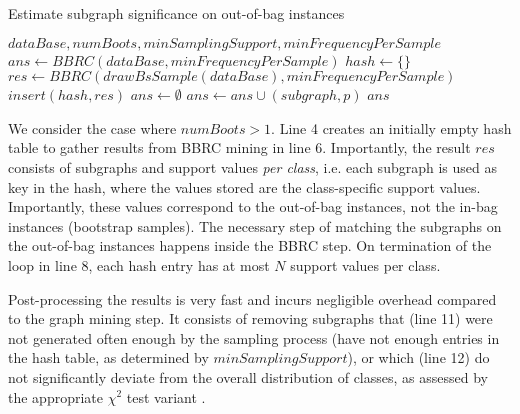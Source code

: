 \documentclass{article}
\begin{document}
\renewcommand{\algorithmicrequire}{\textbf{Input:}}
\renewcommand{\algorithmicensure}{\textbf{Output:}}
\begin{algorithm}
  \caption{Estimate subgraph significance on out-of-bag instances}
  \label{alg:bbrc-sample}
\begin{algorithmic}[1]
  \Require $dataBase, numBoots, minSamplingSupport, minFrequencyPerSample$
    \State $ans \gets BBRC(dataBase, minFrequencyPerSample)$
  \Else
    \State $hash \gets \{\}$
     
        \State $res \gets BBRC(drawBsSample(dataBase), minFrequencyPerSample)$
      \State $insert(hash,res)$
    \EndFor
    \State $ans \gets \emptyset$
          \State $ans\gets ans \cup (subgraph,p)$
        \EndIf
      \EndIf
    \EndFor
  \EndIf
  \Ensure $ans$
\end{algorithmic}
\end{algorithm}

We consider the case where $numBoots>1$. Line 4 creates an initially empty hash
table to gather results from BBRC mining in line 6. Importantly, the result
$res$ consists of subgraphs and support values \emph{per class}, i.e. each
subgraph is used as key in the hash, where the values stored are the
class-specific support values. Importantly, these values correspond to the
out-of-bag instances, not the in-bag instances (bootstrap samples). The
necessary step of matching the subgraphs on the out-of-bag instances happens
inside the BBRC step. On termination of the loop in line 8, each hash entry has
at most $N$ support values per class.

Post-processing the results is very fast and incurs negligible overhead
compared to the graph mining step. It consists of removing subgraphs that (line
11) were not generated often enough by the sampling process (have not enough
entries in the hash table, as determined by $minSamplingSupport$), or which
(line 12) do not significantly deviate from the overall distribution of classes,
as assessed by the appropriate $\chi^2$ test variant .

\end{document}
